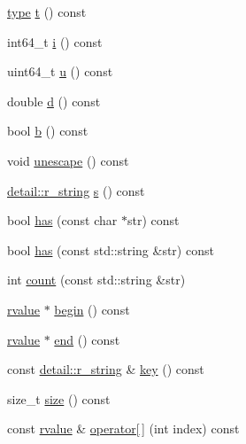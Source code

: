 \begin{DoxyCompactItemize}
\hyperlink{namespacecrow_1_1json_adb9569a402d1b289a75025c8c96e5d99}{type} \hyperlink{classcrow_1_1json_1_1rvalue_a596957ce615a71afba8517d066554383}{t} () const 
\item 
int64\-\_\-t \hyperlink{classcrow_1_1json_1_1rvalue_aa1278bfe88422dd8433aa9b463764dfd}{i} () const 
\item 
uint64\-\_\-t \hyperlink{classcrow_1_1json_1_1rvalue_a9f6f463431193b55bd8e0382d09e1665}{u} () const 
\item 
double \hyperlink{classcrow_1_1json_1_1rvalue_a29172ace3a8cf89841096e2e964cde59}{d} () const 
\item 
bool \hyperlink{classcrow_1_1json_1_1rvalue_afd8b2666bb9843d62ea7a6cc5c6c22af}{b} () const 
\item 
void \hyperlink{classcrow_1_1json_1_1rvalue_a4547a0694408bfc57d8a05d6a3664b54}{unescape} () const 
\item 
\hyperlink{structcrow_1_1json_1_1detail_1_1r__string}{detail\-::r\-\_\-string} \hyperlink{classcrow_1_1json_1_1rvalue_aa7ee454f63af32da93233510e60cbe8f}{s} () const 
\item 
bool \hyperlink{classcrow_1_1json_1_1rvalue_a44362ba33e3b182898d1e799996bbd16}{has} (const char $\ast$str) const 
\item 
bool \hyperlink{classcrow_1_1json_1_1rvalue_a800de59a0558733f64924d075bc2e65c}{has} (const std\-::string \&str) const 
\item 
int \hyperlink{classcrow_1_1json_1_1rvalue_a36b626fa33f7471c184b9b63a01ec9b6}{count} (const std\-::string \&str)
\item 
\hyperlink{classcrow_1_1json_1_1rvalue}{rvalue} $\ast$ \hyperlink{classcrow_1_1json_1_1rvalue_afe7f56e18b89354e74d4d60c3a00cf26}{begin} () const 
\item 
\hyperlink{classcrow_1_1json_1_1rvalue}{rvalue} $\ast$ \hyperlink{classcrow_1_1json_1_1rvalue_a7257b4bb47010c1cb297c3cdde95f9bc}{end} () const 
\item 
const \hyperlink{structcrow_1_1json_1_1detail_1_1r__string}{detail\-::r\-\_\-string} \& \hyperlink{classcrow_1_1json_1_1rvalue_ade473003ebeb805f3d799fa984c29443}{key} () const 
\item 
size\-\_\-t \hyperlink{classcrow_1_1json_1_1rvalue_ae81a5701e24fe2c1bf349d307bc486d2}{size} () const 
\item 
const \hyperlink{classcrow_1_1json_1_1rvalue}{rvalue} \& \hyperlink{classcrow_1_1json_1_1rvalue_aa1b12b0ff7b2661da5dba4f7b35d5b8a}{operator\mbox{[}$\,$\mbox{]}} (int index) const 
\item 

\end{DoxyCompactItemize}
